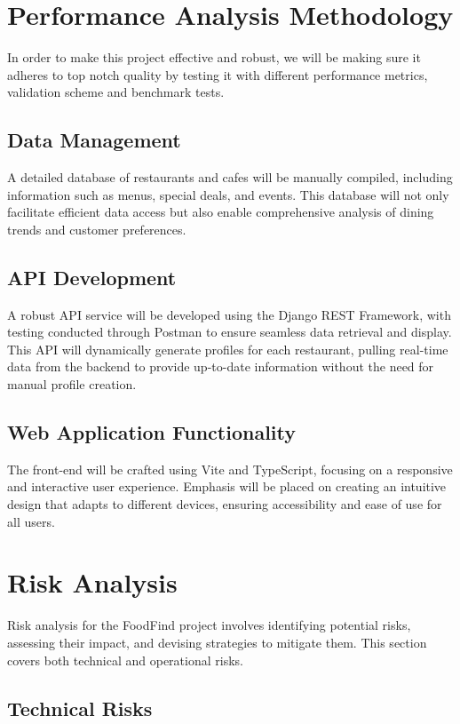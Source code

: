 \documentclass[12pt, a4paper, oneside]{article}
\begin{document}
\pagebreak
\section{Performance Analysis Methodology}

In order to make this project effective and robust, we will be making sure it adheres to top notch quality by testing it with different performance metrics, validation scheme and benchmark tests. 

\subsection{Data Management}
A detailed database of restaurants and cafes will be manually compiled, including information such as menus, special deals, and events. This database will not only facilitate efficient data access but also enable comprehensive analysis of dining trends and customer preferences.

\subsection{API Development}
A robust API service will be developed using the Django REST Framework, with testing conducted through Postman to ensure seamless data retrieval and display. This API will dynamically generate profiles for each restaurant, pulling real-time data from the backend to provide up-to-date information without the need for manual profile creation.

\subsection{Web Application Functionality}
The front-end will be crafted using Vite and TypeScript, focusing on a responsive and interactive user experience. Emphasis will be placed on creating an intuitive design that adapts to different devices, ensuring accessibility and ease of use for all users.
\pagebreak


\section{Risk Analysis}

Risk analysis for the FoodFind project involves identifying potential risks, assessing their impact, and devising strategies to mitigate them. This section covers both technical and operational risks.

\subsection{Technical Risks}
\end{document}
